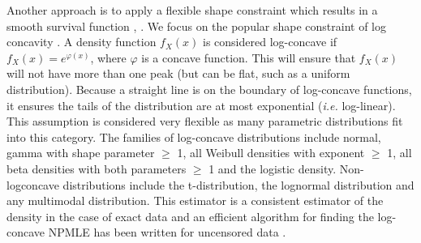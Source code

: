 	
	 
	
		
	Another approach is to apply a flexible shape constraint which results in a smooth survival function \cite{RefDFJ2006}, \cite{RefDea2014}. We focus on the popular shape constraint of log concavity \cite{RefBB2005}. A density function $f_X(x)$ is considered log-concave if $f_X(x) = e^{\varphi(x)}$, where $\varphi$ is a concave function. This will ensure that $f_X(x)$ will not have more than one peak (but can be flat, such as a uniform distribution). Because a straight line is on the boundary of log-concave functions, it ensures the tails of the distribution are at most exponential (\emph{i.e.} log-linear). This assumption is considered very flexible as many parametric distributions fit into this category. The families of log-concave distributions include normal, gamma with shape parameter $\ge$ 1, all Weibull densities with exponent $\ge$ 1, all beta densities with both parameters $\ge$ 1 and the logistic density. Non-logconcave distributions include the t-distribution, the lognormal distribution and any multimodal distribution. This estimator is a consistent estimator of the density in the case of exact data \cite{RefDR2009} and an efficient algorithm for finding the log-concave NPMLE has been written for uncensored data \cite{RefDea2007}. 

